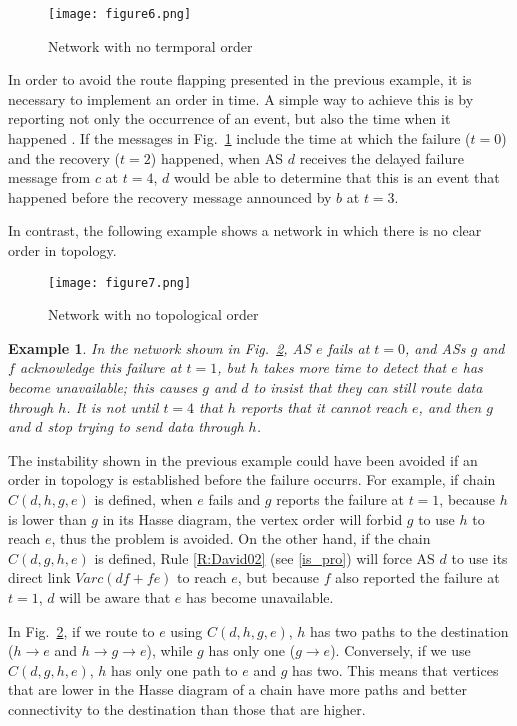 \documentclass[5p,twocolumn]{elsarticle}
\newtheorem{example}{Example}
\begin{document}
\begin{figure}[!t]
	\centering
		\texttt{[image: figure6.png]}
	\caption{Network with no termporal order}
	\label{fig:73_TempOrder}
\end{figure}

In order to avoid the route flapping presented in the previous example, it is necessary to implement an order in time. A simple way to achieve this is by reporting not only the occurrence of an event, but also the time when it happened \cite{Chandrashekar2005, Pei2005}. If the messages in Fig.\ \ref{fig:73_TempOrder} include the time at which the failure ($t=0$) and the recovery ($t=2$) happened, when AS $d$ receives the delayed failure message from $c$ at $t=4$, $d$ would be able to determine that this is an event that happened before the recovery message announced by $b$ at $t=3$.

In contrast, the following example shows a network in which there is no clear order in topology.

\begin{figure}[!t]
	\centering
		\texttt{[image: figure7.png]}
	\caption{Network with no topological order}
	\label{fig:74_TopoOrder}
\end{figure}

\begin{example}
In the network shown in Fig.\ \ref{fig:74_TopoOrder}, AS $e$ fails at $t=0$, and ASs $g$ and $f$ acknowledge this failure at $t=1$, but $h$ takes more time to detect that $e$ has become unavailable; this causes $g$ and $d$ to insist that they can still route data through $h$. It is not until $t=4$ that $h$ reports that it cannot reach $e$, and then $g$ and $d$ stop trying to send data through $h$.
\end{example}

The instability shown in the previous example could have been avoided if an order in topology is established before the failure occurrs. For example, if chain $C(d, h, g, e)$ is defined, when $e$ fails and $g$ reports the failure at $t=1$, because $h$ is lower than $g$ in its Hasse diagram, the vertex order will forbid $g$ to use $h$ to reach $e$, thus the problem is avoided. On the other hand, if the chain $C(d, g, h, e)$ is defined, Rule \ref{R:David02} (see \ref{is_pro}) will force AS $d$ to use its direct link $Varc(df+fe)$ to reach $e$, but because $f$ also reported the failure at $t=1$, $d$ will be aware that $e$ has become unavailable.

In Fig.\ \ref{fig:74_TopoOrder}, if we route to $e$ using $C(d, h, g, e)$, $h$ has two paths to the destination ($h \rightarrow e$ and $h \rightarrow g \rightarrow e$), while $g$ has only one ($g \rightarrow e$). Conversely, if we use  $C(d, g, h, e)$, $h$ has only one path to $e$ and $g$ has two. This means that vertices that are lower in the Hasse diagram of a chain have more paths and better connectivity to the destination than those that are higher.
\end{document}
